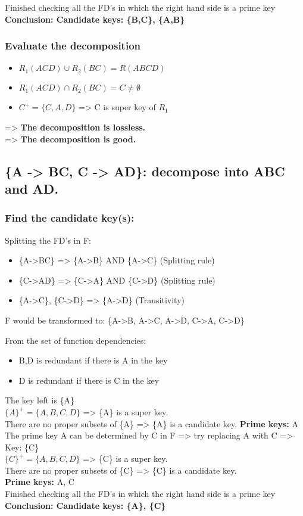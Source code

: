 Finished checking all the FD's in which the right hand side is a prime key \\
\textbf{Conclusion: Candidate keys: \{B,C\}, \{A,B\}}

\subsubsection{Evaluate the decomposition}
\begin{itemize}
    \item $R_{1}(ACD) \cup R_{2}(BC) = R(ABCD)$
    \item $R_{1}(ACD) \cap R_{2}(BC) = C \neq \emptyset$
    \item $C^{+} = \{C,A,D\}$ => C is super key of $R_{1}$
\end{itemize}
=> \textbf{The decomposition is lossless.} \\
=> \textbf{The decomposition is good.}

\newpage
\subsection{\{A -> BC, C -> AD\}: decompose into ABC and AD.}
\subsubsection{Find the candidate key(s):}
Splitting the FD's in F:
\begin{itemize}
    \item \{A->BC\} => \{A->B\} AND \{A->C\} (Splitting rule)
    \item \{C->AD\} => \{C->A\} AND \{C->D\} (Splitting rule)
    \item \{A->C\}, \{C->D\} => \{A->D\} (Transitivity)
\end{itemize}
F would be transformed to: \{A->B, A->C, A->D, C->A, C->D\}

From the set of function dependencies:
\begin{itemize}
    \item B,D is redundant if there is A in the key
    \item D is redundant if there is C in the key
\end{itemize}
The key left is \{A\} \\
$\{A\}^{+} = \{A,B,C,D\}$ => \{A\} is a super key. \\
There are no proper subsets of \{A\} => \{A\} is a candidate key.
\textbf{Prime keys:} A \\
The prime key A can be determined by C in F => try replacing A with C => Key: \{C\} \\
$\{C\}^{+} = \{A,B,C,D\}$ => \{C\} is a super key. \\
There are no proper subsets of \{C\} => \{C\} is a candidate key. \\
\textbf{Prime keys:} A, C \\
Finished checking all the FD's in which the right hand side is a prime key \\
\textbf{Conclusion: Candidate keys: \{A\}, \{C\}}


